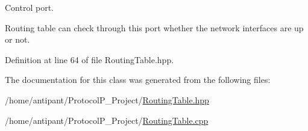 Control port. 

Routing table can check through this port whether the network interfaces are up or not. 

Definition at line 64 of file Routing\-Table.\-hpp.



The documentation for this class was generated from the following files\-:\begin{DoxyCompactItemize}
\item 
/home/antipant/\-Protocol\-P\-\_\-\-Project/\hyperlink{RoutingTable_8hpp}{Routing\-Table.\-hpp}\item 
/home/antipant/\-Protocol\-P\-\_\-\-Project/\hyperlink{RoutingTable_8cpp}{Routing\-Table.\-cpp}\end{DoxyCompactItemize}
